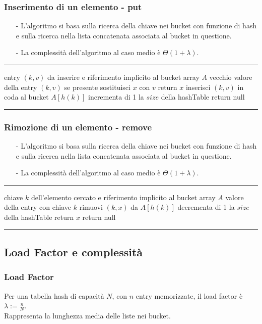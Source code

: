 \documentclass[a4paper]{article}
\makeatletter
\newenvironment{algo}[4]{
	\noindent\rule{\textwidth}{0.4pt}
	\begin{algorithmic}[1]
		\addtocounter{ALG@line}{-1}
		\Procedure{#1}{#2}
		\Require #3
		\Ensure #4
		\Statex }{
		\EndProcedure
	\end{algorithmic}
	\rule{\textwidth}{0.4pt}}
\makeatother
\begin{document}
\subsubsection*{Inserimento di un elemento - put}
\begin{itemize}[topsep=3pt, itemsep=0pt]
	\item[-] L'algoritmo si basa sulla ricerca della chiave nei bucket con funzione di hash e sulla ricerca nella lista concatenata
	associata al bucket in questione.
	\item[-] La complessità dell'algoritmo al caso medio è \(\Theta(1+\lambda)\).
\end{itemize}
\begin{algo}{put}{$k$, $v$}{entry $(k,v)$ da inserire e riferimento implicito al bucket array $A$}{vecchio valore della entry $(k,v)$ se presente}
		\State sostituisci $x$ con $v$
		\State return $x$
	\Else
		\State inserisci $(k,v)$ in coda al bucket $A[h(k)]$
		\State incrementa di 1 la $size$ della hashTable
		\State return null
	\EndIf
\end{algo}

\subsubsection*{Rimozione di un elemento - remove}
\begin{itemize}[topsep=3pt, itemsep=0pt]
	\item[-] L'algoritmo si basa sulla ricerca della chiave nei bucket con funzione di hash e sulla ricerca nella lista concatenata
	associata al bucket in questione.
	\item[-] La complessità dell'algoritmo al caso medio è \(\Theta(1+\lambda)\).
\end{itemize}
\begin{algo}{get}{$k$}{chiave $k$ dell'elemento cercato e riferimento implicito al bucket array $A$}{valore della entry con chiave $k$}
		\State rimuovi $(k,x)$ da \(A[h(k)]\)
		\State decrementa di 1 la $size$ della hashTable
		\State return $x$
	\Else
		\State return null
	\EndIf
\end{algo}

\subsection{Load Factor e complessità}
\subsubsection*{Load Factor}
Per una tabella hash di capacità \(N\), con \(n\) entry memorizzate, il load factor è \(\lambda := \displaystyle\frac{n}{N}\). \\ 
Rappresenta la lunghezza media delle liste nei bucket.
\end{document}
